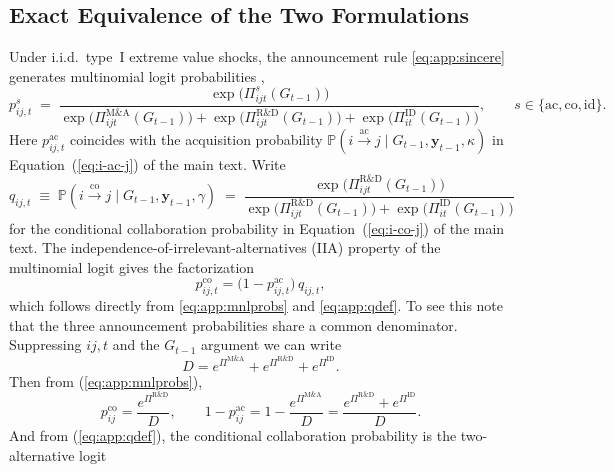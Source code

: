 \subsection{Exact Equivalence of the Two Formulations}
\label{app:equivalence:exact}
Under i.i.d.\ type~I extreme value shocks, the announcement rule
\eqref{eq:app:sincere} generates multinomial logit probabilities
\citep{McFADDEN1974,train2009discrete},
\begin{equation}
  p^{s}_{ij,t}
  \;=\;
  \frac{\exp \bigl( \Pi^{s}_{ijt}(G_{t-1}) \bigr)}
       {\exp \bigl( \Pi^{\mathrm{M\&A}}_{ijt}(G_{t-1}) \bigr)
        + \exp \bigl( \Pi^{\mathrm{R\&D}}_{ijt}(G_{t-1}) \bigr)
        + \exp \bigl( \Pi^{\mathrm{ID}}_{it}(G_{t-1}) \bigr)},
  \qquad s \in \{\mathrm{ac}, \mathrm{co}, \mathrm{id}\}.
  \label{eq:app:mnlprobs}
\end{equation}
Here $p^{\mathrm{ac}}_{ij,t}$ coincides with the acquisition
probability $\mathbb{P}(i \xrightarrow{\mathrm{ac}} j \mid G_{t-1},
\mathbf{y}_{t-1}, \kappa)$ in Equation~(\ref{eq:i-ac-j}) of the main
text. Write
\begin{equation}
  q_{ij,t}
  \;\equiv\;
  \mathbb{P}(i \xrightarrow{\mathrm{co}} j \mid G_{t-1},
  \mathbf{y}_{t-1}, \gamma)
  \;=\;
  \frac{\exp \bigl( \Pi^{\mathrm{R\&D}}_{ijt}(G_{t-1}) \bigr)}
       {\exp \bigl( \Pi^{\mathrm{R\&D}}_{ijt}(G_{t-1}) \bigr)
        + \exp \bigl( \Pi^{\mathrm{ID}}_{it}(G_{t-1}) \bigr)}
  \label{eq:app:qdef}
\end{equation}
for the conditional collaboration probability in
Equation~(\ref{eq:i-co-j}) of the main text. The independence-of-irrelevant-alternatives (IIA) property of the
multinomial logit gives the factorization
\begin{equation}
  p^{\mathrm{co}}_{ij,t}
  = \bigl( 1 - p^{\mathrm{ac}}_{ij,t} \bigr)\, q_{ij,t},
  \label{eq:app:iia}
\end{equation}
which follows directly from \eqref{eq:app:mnlprobs} and
\eqref{eq:app:qdef}. To see this note that the three announcement probabilities share a common denominator. Suppressing $ij,t$ and the $G_{t-1}$ argument we can write 
\[
D = e^{\Pi^{\text{M\&A}}} + e^{\Pi^{\text{R\&D}}} + e^{\Pi^{\text{ID}}}.
\] 
Then from (\ref{eq:app:mnlprobs}),
\[
p^{\text{co}}_{ij} = \frac{e^{\Pi^{\text{R\&D}}}}{D}, \qquad 1 - p^{\text{ac}}_{ij} = 1 - \frac{e^{\Pi^{\text{M\&A}}}}{D} = \frac{e^{\Pi^{\text{R\&D}}} + e^{\Pi^{\text{ID}}}}{D}.
\]
And from (\ref{eq:app:qdef}), the conditional collaboration probability is the two-alternative logit
